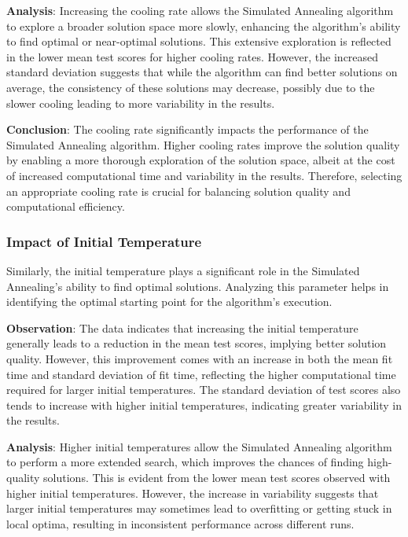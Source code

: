 \documentclass[
]{article}
\begin{document}
    \textbf{Analysis}: Increasing the cooling rate allows the Simulated Annealing algorithm to explore a broader solution space more slowly, enhancing the algorithm's ability to find optimal or near-optimal solutions. This extensive exploration is reflected in the lower mean test scores for higher cooling rates. However, the increased standard deviation suggests that while the algorithm can find better solutions on average, the consistency of these solutions may decrease, possibly due to the slower cooling leading to more variability in the results.

    \textbf{Conclusion}: The cooling rate significantly impacts the performance of the Simulated Annealing algorithm. Higher cooling rates improve the solution quality by enabling a more thorough exploration of the solution space, albeit at the cost of increased computational time and variability in the results. Therefore, selecting an appropriate cooling rate is crucial for balancing solution quality and computational efficiency.

    \subsubsection{Impact of Initial Temperature}

    Similarly, the initial temperature plays a significant role in the Simulated Annealing’s ability to find optimal solutions. Analyzing this parameter helps in identifying the optimal starting point for the algorithm’s execution.

    \textbf{Observation}: The data indicates that increasing the initial temperature generally leads to a reduction in the mean test scores, implying better solution quality. However, this improvement comes with an increase in both the mean fit time and standard deviation of fit time, reflecting the higher computational time required for larger initial temperatures. The standard deviation of test scores also tends to increase with higher initial temperatures, indicating greater variability in the results.

    \textbf{Analysis}: Higher initial temperatures allow the Simulated Annealing algorithm to perform a more extended search, which improves the chances of finding high-quality solutions. This is evident from the lower mean test scores observed with higher initial temperatures. However, the increase in variability suggests that larger initial temperatures may sometimes lead to overfitting or getting stuck in local optima, resulting in inconsistent performance across different runs.
\end{document}
